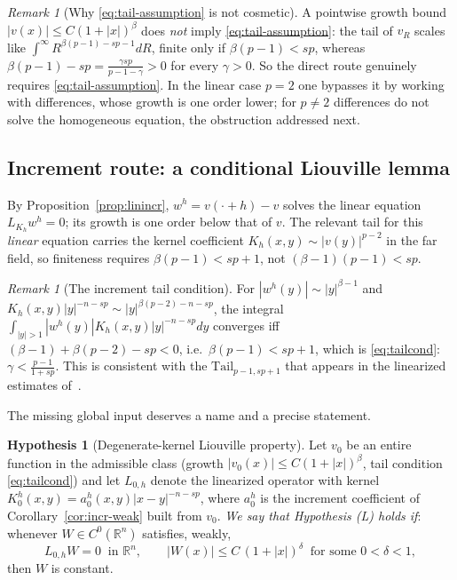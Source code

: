 \documentclass[11pt]{amsart}
\theoremstyle{plain}
\theoremstyle{definition}
\newtheorem{hypothesis}[theorem]{Hypothesis}
\theoremstyle{remark}
\newtheorem{remark}[theorem]{Remark}
\newcommand{\R}{\mathbb{R}}
\begin{document}
\begin{remark}[Why \eqref{eq:tail-assumption} is not cosmetic]\label{rem:tail}
A pointwise growth bound $|v(x)|\le C(1+|x|)^{\beta}$ does \emph{not} imply
\eqref{eq:tail-assumption}: the tail of $v_R$ scales like
$\int^\infty R^{\beta(p-1)-sp-1}dR$, finite only if $\beta(p-1)<sp$, whereas
$\beta(p-1)-sp=\frac{\gamma sp}{p-1-\gamma}>0$ for every $\gamma>0$. So the
direct route genuinely requires \eqref{eq:tail-assumption}. In the linear case
$p=2$ one bypasses it by working with differences, whose growth is one order
lower; for $p\neq2$ differences do not solve the homogeneous equation, the
obstruction addressed next.
\end{remark}

\subsection{Increment route: a conditional Liouville lemma}
By Proposition~\ref{prop:linincr}, $w^h=v(\cdot+h)-v$ solves the linear
equation $L_{K_h}w^h=0$; its growth is one order below that of $v$. The
relevant tail for this \emph{linear} equation carries the kernel coefficient
$K_h(x,y)\sim|v(y)|^{p-2}$ in the far field, so finiteness requires
$\beta(p-1)<sp+1$, not $(\beta-1)(p-1)<sp$.

\begin{remark}[The increment tail condition]\label{rem:tailcond}
For $|w^h(y)|\sim|y|^{\beta-1}$ and $K_h(x,y)|y|^{-n-sp}\sim
|y|^{\beta(p-2)-n-sp}$, the integral $\int_{|y|>1}|w^h(y)|K_h(x,y)|y|^{-n-sp}dy$
converges iff $(\beta-1)+\beta(p-2)-sp<0$, i.e.\ $\beta(p-1)<sp+1$, which is
\eqref{eq:tailcond}: $\gamma<\frac{p-1}{1+sp}$. This is consistent with the
$\mathrm{Tail}_{p-1,sp+1}$ that appears in the linearized estimates of~\cite{GJS}.
\end{remark}

The missing global input deserves a name and a precise statement.

\begin{hypothesis}[Degenerate-kernel Liouville property]\label{hyp:L}
Let $v_0$ be an entire function in the admissible class \textnormal{(}growth
$|v_0(x)|\le C(1+|x|)^{\beta}$, tail condition \eqref{eq:tailcond}\textnormal{)}
and let $L_{0,h}$ denote the linearized operator with kernel
$K_0^h(x,y)=a_0^h(x,y)|x-y|^{-n-sp}$, where $a_0^h$ is the increment
coefficient of Corollary~\ref{cor:incr-weak} built from $v_0$. \emph{We say
that Hypothesis \textnormal{(L)} holds if}: whenever $W\in C^0(\R^n)$
satisfies, weakly,
\[
  L_{0,h}W=0\ \text{ in }\R^n,
  \qquad |W(x)|\le C\,(1+|x|)^{\delta}\ \text{ for some }0<\delta<1,
\]
then $W$ is constant.
\end{hypothesis}
\end{document}
